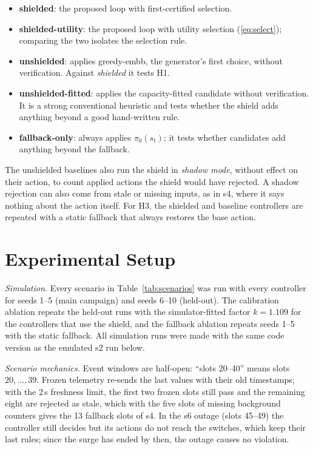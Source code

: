 \documentclass[conference]{IEEEtran}
\begin{document}
\begin{itemize}
\item \textbf{shielded}: the proposed loop with first-certified selection.
\item \textbf{shielded-utility}: the proposed loop with utility selection
(\ref{eq:select}); comparing the two isolates the selection rule.
\item \textbf{unshielded}: applies greedy-embb, the generator's first choice, without
verification. Against \emph{shielded} it tests H1.
\item \textbf{unshielded-fitted}: applies the capacity-fitted candidate without
verification. It is a strong conventional heuristic and tests whether the shield
adds anything beyond a good hand-written rule.
\item \textbf{fallback-only}: always applies $\pi_0(s_t)$; it tests whether
candidates add anything beyond the fallback.
\end{itemize}

The unshielded baselines also run the shield in \emph{shadow mode}, without effect on
their action, to count applied actions the shield would have rejected. A shadow rejection can
also come from stale or missing inputs, as in s4, where it says nothing about the
action itself. For H3, the
shielded and baseline controllers are repeated with a static fallback that always
restores the base action.

\section{Experimental Setup}
\label{sec:setup}

\emph{Simulation.} Every scenario in Table~\ref{tab:scenarios} was run with every
controller for seeds 1--5 (main campaign) and seeds 6--10 (held-out). The calibration
ablation repeats the held-out runs with the simulator-fitted factor $k = 1.109$ for
the controllers that use the shield, and the fallback ablation repeats seeds 1--5
with the static fallback. All simulation runs were made with the same code version
as the emulated s2 run below.

\emph{Scenario mechanics.} Event windows are half-open: ``slots 20--40'' means
slots $20,\dots,39$. Frozen telemetry re-sends the last values with their old
timestamps; with the 2\,s freshness limit, the first two frozen slots still pass and
the remaining eight are rejected as stale, which with the five slots of missing
background counters gives the 13 fallback slots of s4. In the s6 outage (slots
45--49) the controller still decides but its actions do not reach the switches, which
keep their last rules; since the surge has ended by then, the outage causes no
violation.
\end{document}

